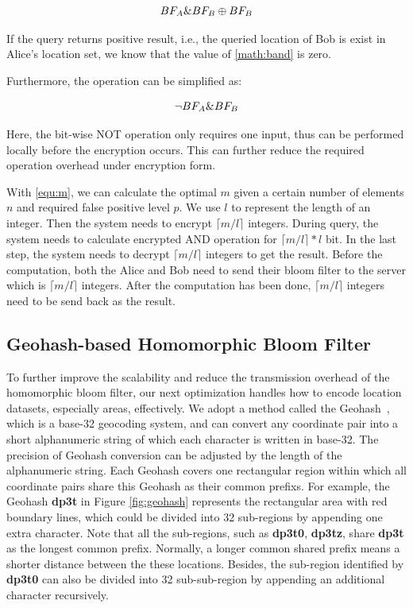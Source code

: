 \begin{equation}
\vspace{-0.1in}
BF_{A} \& BF_{B} \oplus BF_{B}
\label{math:band}
\end{equation}

If the query returns positive result, i.e., the queried location of Bob is exist in Alice’s location set, we know that the value of \autoref{math:band} is zero.

Furthermore, the operation can be simplified as:

\begin{equation}
\vspace{-0.1in}
\neg BF_{A} \& BF_{B}
\label{math:band_simple}
\end{equation}

Here, the bit-wise NOT operation only requires one input, thus can be performed locally before the encryption occurs. This can further reduce the required operation overhead under encryption form.

With \autoref{equ:m}, we can calculate the optimal $m$ given a certain number of elements $n$ and required false positive level $p$. We use $l$ to represent the length of an integer. Then the system needs to encrypt $\lceil m/l \rceil$ integers. During query, the system needs to calculate encrypted AND operation for $\lceil m/l \rceil * l$ bit. In the last step, the system needs to decrypt $\lceil m/l \rceil$ integers to get the result. Before the computation, both the Alice and Bob need to send their bloom filter to the server which is $\lceil m/l \rceil$ integers. After the computation has been done, $\lceil m/l \rceil$ integers need to be send back as the result.


\subsection{Geohash-based Homomorphic Bloom Filter}
To further improve the scalability and reduce the transmission overhead of the homomorphic bloom filter, our next optimization handles how to encode location datasets, especially areas, effectively. We adopt a method called the Geohash~\cite{moussalli2015fast}, which is a base-32 geocoding system, and can convert any coordinate pair into a short alphanumeric string of which each character is written in base-32. The precision of Geohash conversion can be adjusted by the length of the alphanumeric string. Each Geohash covers one rectangular region within which all coordinate pairs share this Geohash as their common prefixs. For example, the Geohash \textbf{dp3t} in Figure \ref{fig:geohash} represents the rectangular area with red boundary lines, which could be divided into 32 sub-regions by appending one extra character. Note that all the sub-regions, such as \textbf{dp3t0}, \textbf{dp3tz}, share \textbf{dp3t} as the longest common prefix. Normally, a longer common shared prefix means a shorter distance between the these locations. Besides, the sub-region identified by \textbf{dp3t0} can also be divided into 32 sub-sub-region by appending an additional character recursively.

